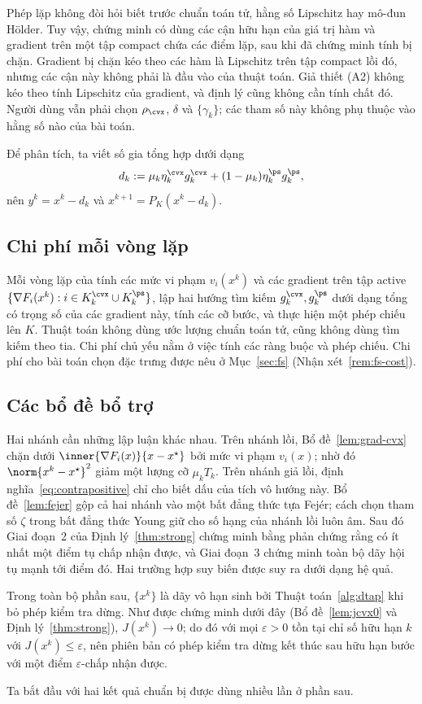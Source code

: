 \begin{remark}\label{rem:regularity-scope}
Phép lặp không đòi hỏi biết trước chuẩn toán tử, hằng số Lipschitz hay
mô-đun H\"older. Tuy vậy, chứng minh có dùng các cận hữu hạn của giá trị hàm và
gradient trên một tập compact chứa các điểm lặp, sau khi đã chứng minh tính bị chặn.
Gradient bị chặn kéo theo các hàm là Lipschitz trên tập compact lồi đó,
nhưng các cận này không phải là đầu vào của thuật toán. Giả thiết (A2) không
kéo theo tính Lipschitz của gradient, và định lý cũng không cần tính chất đó.
Người dùng vẫn phải chọn $\rho_{\cvx}$, $\delta$ và $\{\gamma_k\}$; các tham số này không
phụ thuộc vào hằng số nào của bài toán.
\end{remark}

Để phân tích, ta viết số gia tổng hợp dưới dạng
\begin{equation}\label{eq:dk}
d_k:=\mu_k\eta^{\cvx}_k g^{\cvx}_k+(1-\mu_k)\eta^{\ps}_k g^{\ps}_k,
\end{equation}
nên $y^k=x^k-d_k$ và $x^{k+1}=P_K(x^k-d_k)$.
\subsection{Chi phí mỗi vòng lặp}\label{ssec:complexity}
Mỗi vòng lặp của \dtap{} tính
các mức vi phạm $v_i(x^k)$ và các gradient trên tập active $\{\nabla F_i(x^k):i\in
K^{\cvx}_k\cup K^{\ps}_k\}$, lập hai hướng tìm kiếm $g^{\cvx}_k,g^{\ps}_k$ dưới dạng tổng có trọng số
của các gradient này, tính các cỡ bước, và thực hiện một phép chiếu lên $K$.
Thuật toán không dùng ước lượng chuẩn toán tử, cũng không dùng tìm kiếm theo tia. Chi phí chủ yếu nằm ở
việc tính các ràng buộc và phép chiếu. Chi phí cho bài toán chọn đặc trưng
được nêu ở Mục~\ref{sec:fs}
(Nhận xét~\ref{rem:fs-cost}).

\subsection{Các bổ đề bổ trợ}\label{ssec:aux}
Hai nhánh cần những lập luận khác nhau. Trên nhánh lồi, Bổ đề~\ref{lem:grad-cvx} chặn dưới
$\inner{\nabla F_i(x)}{x-x^\star}$ bởi mức vi phạm $v_i(x)$; nhờ đó $\norm{x^k-x^\star}^2$ giảm
một lượng cỡ $\mu_kT_k$. Trên nhánh giả lồi,
định nghĩa~\eqref{eq:contrapositive} chỉ cho biết dấu của tích vô hướng này.
Bổ đề~\ref{lem:fejer} gộp cả hai nhánh vào một bất đẳng thức tựa Fej\'er; cách chọn
tham số $\zeta$ trong bất đẳng thức Young giữ cho số hạng của nhánh lồi luôn âm. Sau đó Giai đoạn~2 của
Định lý~\ref{thm:strong} chứng minh bằng phản chứng rằng có ít nhất một điểm tụ
chấp nhận được, và Giai đoạn~3 chứng minh toàn bộ dãy hội tụ mạnh tới điểm đó. Hai trường hợp suy biến
được suy ra dưới dạng hệ quả.

Trong toàn bộ phần sau, $\{x^k\}$ là dãy vô hạn sinh bởi Thuật toán~\ref{alg:dtap} khi
bỏ phép kiểm tra dừng. Như được chứng minh dưới đây
(Bổ đề~\ref{lem:jcvx0} và Định lý~\ref{thm:strong}), $J(x^k)\to 0$; do đó với mọi
$\varepsilon>0$ tồn tại chỉ số hữu hạn $k$ với $J(x^k)\le\varepsilon$, nên phiên bản có phép kiểm tra dừng
kết thúc sau hữu hạn bước với một điểm $\varepsilon$-chấp nhận được.

Ta bắt đầu với hai kết quả chuẩn bị được dùng nhiều lần ở phần sau.

